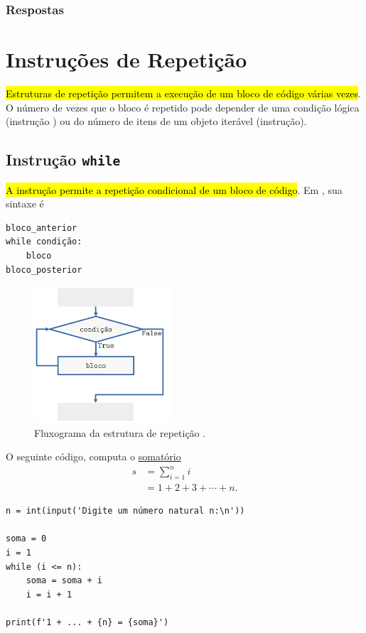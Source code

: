 \ifisbook
\newpage
\subsubsection{Respostas}
\shipoutAnswer
\fi


\section{Instruções de Repetição}\label{cap_progest_sec_repete}

\hl{Estruturas de repetição permitem a execução de um bloco de código várias vezes}. O número de vezes que o bloco é repetido pode depender de uma condição lógica (instrução {\PYTHONwhile}) ou do número de itens de um objeto iterável (instrução{\PYTHONfor}).

\subsection{Instrução \texttt{while}}

\hl{A instrução {\PYTHONwhile} permite a repetição condicional de um bloco de código}. Em {\python}, sua sintaxe é

\begin{lstlisting}
bloco_anterior
while condição:
    bloco
bloco_posterior
\end{lstlisting}

\begin{figure}[H]
  \centering
  \includegraphics[width=2in]{./cap_progest/dados/fig_fg_while/fig.png}
  \caption{Fluxograma da estrutura de repetição {\PYTHONwhile}.}
  \label{fig:cap_progest_sec_repete:fig:fg_while}
\end{figure}

\begin{ex}\label{cap_progest_ec_repete:ex:while_soma_num}
  O seguinte código, computa o \href{https://pt.wikipedia.org/wiki/Somat%C3%B3rio}{somatório}
  \begin{align}
    s &= \sum_{i=1}^{n}i\\
      &= 1 + 2 + 3 + \cdots + n.
  \end{align}

\begin{lstlisting}
n = int(input('Digite um número natural n:\n'))

soma = 0
i = 1
while (i <= n):
    soma = soma + i
    i = i + 1

print(f'1 + ... + {n} = {soma}')
\end{lstlisting}

\end{ex}

